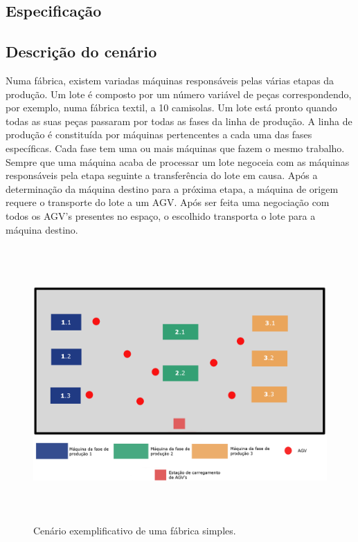 \begin{titlepage}

\section{Especificação}

\subsection{Descrição do cenário}
Numa fábrica, existem variadas máquinas responsáveis pelas várias etapas da produção. Um lote é composto por um número variável de peças correspondendo, por exemplo, numa fábrica textil, a 10 camisolas. Um lote está pronto quando todas as suas peças passaram por todas as fases da linha de produção. A linha de produção é constituída por máquinas pertencentes a cada uma das fases específicas. Cada fase tem uma ou mais máquinas que fazem o mesmo trabalho. Sempre que uma máquina acaba de processar um lote negoceia com as máquinas responsáveis pela etapa seguinte a transferência do lote em causa. Após a determinação da máquina destino para a próxima etapa, a máquina de origem requere o transporte do lote a um AGV. Após ser feita uma negociação com todos os AGV's presentes no espaço, o escolhido transporta o lote para a máquina destino.

\begin{figure}[H]
  \centering
    \includegraphics[width=18cm, height = 10.5cm]{scenario.png}
  \caption{Cenário exemplificativo de uma fábrica simples.}
  \label{scenario}
\end{figure}


\end{titlepage}
